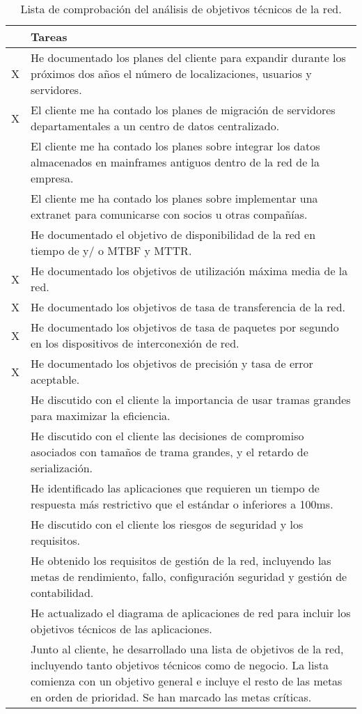 \begin{table}[H]
	\begin{center}
		\begin{tabular}{|c|l|}
			\hline 
			& Tareas  \\ 
			\hline \hline
			X & He documentado los planes del cliente para expandir durante los
			próximos dos años el número de localizaciones, usuarios y servidores.  \\ \hline
			X & El cliente me ha contado los planes de migración de servidores
			departamentales a un centro de datos centralizado.  \\ \hline
			& El cliente me ha contado los planes sobre integrar los datos
			almacenados en mainframes antiguos dentro de la red de la empresa.  \\ \hline
			& El cliente me ha contado los planes sobre implementar una extranet
			para comunicarse con socios u otras compañías.  \\ \hline
		    & He documentado el objetivo de disponibilidad de la red en tiempo de y/
			o MTBF y MTTR.  \\ \hline
			X & He documentado los objetivos de utilización máxima media de la red.  \\ \hline
			X & He documentado los objetivos de tasa de transferencia de la red.  \\ \hline
			X & He documentado los objetivos de tasa de paquetes por segundo en los
			dispositivos de interconexión de red.  \\ \hline
			X & He documentado los objetivos de precisión y tasa de error aceptable.  \\ \hline
			& He discutido con el cliente la importancia de usar tramas grandes para
			maximizar la eficiencia.  \\ \hline
			& He discutido con el cliente las decisiones de compromiso asociados
			con tamaños de trama grandes, y el retardo de serialización.  \\ \hline
			 & He identificado las aplicaciones que requieren un tiempo de respuesta
			más restrictivo que el estándar o inferiores a 100ms.  \\ \hline
			 & He discutido con el cliente los riesgos de seguridad y los requisitos.  \\ \hline
			 & He obtenido los requisitos de gestión de la red, incluyendo las metas de
			rendimiento, fallo, configuración seguridad y gestión de contabilidad.  \\ \hline
			 & He actualizado el diagrama de aplicaciones de red para incluir los objetivos técnicos de las aplicaciones.  \\ \hline
			 & Junto al cliente, he desarrollado una lista de objetivos de la red,
			incluyendo tanto objetivos técnicos como de negocio. La lista
			comienza con un objetivo general e incluye el resto de las metas en
			orden de prioridad. Se han marcado las metas críticas.  \\ \hline
		\end{tabular}
		\caption{Lista de comprobación del análisis de objetivos técnicos de la red.}
		\label{tabla:tabla2}
	\end{center}
\end{table}

